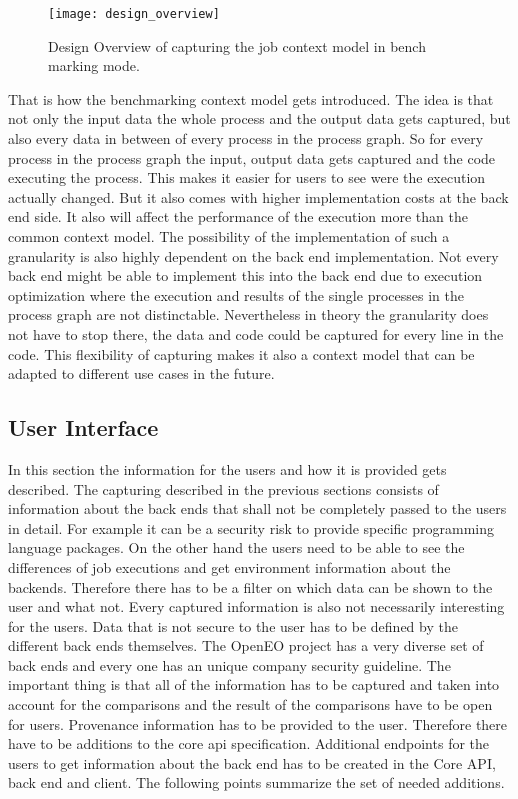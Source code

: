 \documentclass[draft,final]{vutinfth} %
\begin{document}
\begin{figure}[h]
	\centering
	\texttt{[image: design\_overview]}
	\caption{Design Overview of capturing the job context model in bench marking mode.}
	\label{fig:design_overview} %
\end{figure}
That is how the benchmarking context model gets introduced. The idea is that not only the input data the whole process and the output data gets captured, but also every data in between of every process in the process graph. So for every process in the process graph the input, output data gets captured and the code executing the process. This makes it easier for users to see were the execution actually changed. But it also comes with higher implementation costs at the back end side. It also will affect the performance of the execution more than the common context model. The possibility of the implementation of such a granularity is also highly dependent on the back end implementation. Not every back end might be able to implement this into the back end due to execution optimization where the execution and results of the single  processes in the process graph are not distinctable. Nevertheless in theory the granularity does not have to stop there, the data and code could be captured for every line in the code. This flexibility of capturing makes it also a context model that  can be adapted to different use cases in the future.  

\subsection{User Interface}\label{Design:User Interface}
In this section the information for the users and how it is provided gets described. The capturing described in the previous sections consists of  information about the back ends that shall not be completely passed to the users in detail. For example it can be a security risk to provide specific programming language packages. On the other hand the users need to be able to see the differences of job executions and get environment information about the backends. Therefore there has to be a filter on which data can be shown to the user and what not. Every captured information is also not necessarily interesting for the users. Data that is not secure to the user has to be defined by the different back ends themselves. The OpenEO project has a very diverse set of back ends and every one has an unique company security guideline. The important thing is that all of the information has to be captured and taken into account for the comparisons and the result of the comparisons have to be open for users.
Provenance information has to be provided to the user. Therefore there have to be additions to the core api specification. Additional endpoints for the users to get information about the back end has to be created in the Core API, back end and client. The following points summarize the set of needed additions. 
\end{document}
